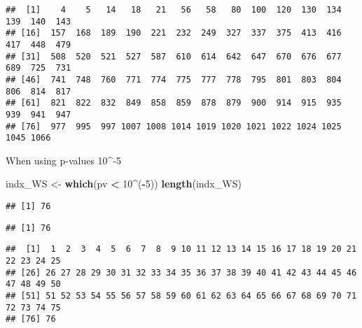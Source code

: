 \documentclass[
]{article}
\newenvironment{Shaded}{\begin{snugshade}}{\end{snugshade}}
\newcommand{\DecValTok}[1]{\textcolor[rgb]{0.00,0.00,0.81}{#1}}
\newcommand{\KeywordTok}[1]{\textcolor[rgb]{0.13,0.29,0.53}{\textbf{#1}}}
\newcommand{\NormalTok}[1]{#1}
\newcommand{\OperatorTok}[1]{\textcolor[rgb]{0.81,0.36,0.00}{\textbf{#1}}}
\newcommand{\StringTok}[1]{\textcolor[rgb]{0.31,0.60,0.02}{#1}}
\begin{document}
\begin{verbatim}
##  [1]    4    5   14   18   21   56   58   80  100  120  130  134  139  140  143
## [16]  157  168  189  190  221  232  249  327  337  375  413  416  417  448  479
## [31]  508  520  521  527  587  610  614  642  647  670  676  677  689  725  731
## [46]  741  748  760  771  774  775  777  778  795  801  803  804  806  814  817
## [61]  821  822  832  849  858  859  878  879  900  914  915  935  939  941  947
## [76]  977  995  997 1007 1008 1014 1019 1020 1021 1022 1024 1025 1045 1066
\end{verbatim}

When using p-values 10\^{}-5

\begin{Shaded}
\begin{Highlighting}[]
\NormalTok{indx_WS <-}\StringTok{  }\KeywordTok{which}\NormalTok{(pv }\OperatorTok{<}\StringTok{ }\DecValTok{10}\OperatorTok{^}\NormalTok{(}\OperatorTok{-}\DecValTok{5}\NormalTok{))}
\KeywordTok{length}\NormalTok{(indx_WS)}
\end{Highlighting}
\end{Shaded}

\begin{verbatim}
## [1] 76
\end{verbatim}

\begin{Shaded}
\end{Shaded}

\begin{verbatim}
## [1] 76
\end{verbatim}

\begin{Shaded}
\end{Shaded}

\begin{verbatim}
##  [1]  1  2  3  4  5  6  7  8  9 10 11 12 13 14 15 16 17 18 19 20 21 22 23 24 25
## [26] 26 27 28 29 30 31 32 33 34 35 36 37 38 39 40 41 42 43 44 45 46 47 48 49 50
## [51] 51 52 53 54 55 56 57 58 59 60 61 62 63 64 65 66 67 68 69 70 71 72 73 74 75
## [76] 76
\end{verbatim}
\end{document}
